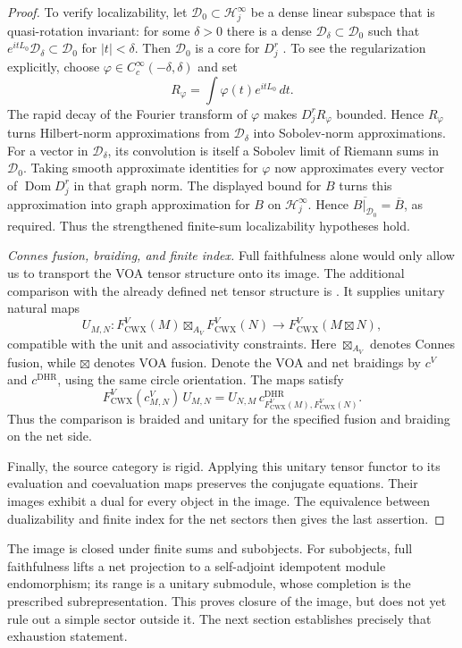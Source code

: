 \begin{proof}
To verify localizability, let $\mathscr D_0\subset\mathcal H_j^\infty$
be a dense linear subspace that is quasi-rotation invariant: for some $\delta>0$ there is
a dense $\mathscr D_\delta\subset\mathscr D_0$ such that
$e^{itL_0}\mathscr D_\delta\subset\mathscr D_0$ for $|t|<\delta$.
Then $\mathscr D_0$ is a core for $D_j^r$
\cite[Lemma~7.2]{CKLW}. To see the regularization explicitly, choose
$\varphi\in C_c^\infty(-\delta,\delta)$ and set
\[
 R_\varphi=\int\varphi(t)e^{itL_0}\,dt.
\]
The rapid decay of the Fourier transform of $\varphi$ makes
$D_j^rR_\varphi$ bounded. Hence $R_\varphi$ turns Hilbert-norm
approximations from $\mathscr D_\delta$ into Sobolev-norm
approximations. For a vector in $\mathscr D_\delta$, its convolution
is itself a Sobolev limit of Riemann sums in $\mathscr D_0$.
Taking smooth approximate identities for $\varphi$ now approximates
every vector of $\operatorname{Dom}D_j^r$ in that graph norm.
The displayed bound for $B$ turns this approximation into graph
approximation for $B$ on $\mathcal H_j^\infty$. Hence
$\overline{B|_{\mathscr D_0}}=\overline B$, as required.
Thus the strengthened finite-sum localizability hypotheses hold.

\smallskip
\noindent\emph{Connes fusion, braiding, and finite index.}
Full faithfulness alone would only allow us to transport the VOA
tensor structure onto its image.  The additional comparison with the
already defined net tensor structure is
\cite[Corollary~3.23]{GuiUnbounded}.
It supplies unitary natural maps
\[
 U_{M,N}:F^V_{\mathrm{CWX}}(M)
       \boxtimes_{A_V}F^V_{\mathrm{CWX}}(N)
       \longrightarrow F^V_{\mathrm{CWX}}(M\boxtimes N),
\]
compatible with the unit and associativity constraints.  Here
$\boxtimes_{A_V}$ denotes Connes fusion, while $\boxtimes$ denotes VOA
fusion.  Denote the VOA and net braidings by $c^V$ and
$c^{\mathrm{DHR}}$, using the same circle orientation.
The maps satisfy
\[
 F^V_{\mathrm{CWX}}(c^{V}_{M,N})\,U_{M,N}
   =U_{N,M}\,
      c^{\mathrm{DHR}}_{F^V_{\mathrm{CWX}}(M),F^V_{\mathrm{CWX}}(N)}.
\]
Thus the comparison is braided and unitary for the specified fusion
and braiding on the net side.

Finally, the source category is rigid.  Applying this unitary tensor
functor to its evaluation and coevaluation maps preserves the
conjugate equations.  Their images exhibit a dual for every object
in the image.  The equivalence between dualizability and finite index
for the net sectors then gives the last assertion.
\end{proof}

The image is closed under finite sums and subobjects.  For subobjects,
full faithfulness lifts a net projection to a self-adjoint idempotent
module endomorphism; its range is a unitary submodule, whose completion
is the prescribed subrepresentation.  This proves closure of the
image, but does not yet rule out a simple sector outside it.
The next section establishes precisely that exhaustion statement.
